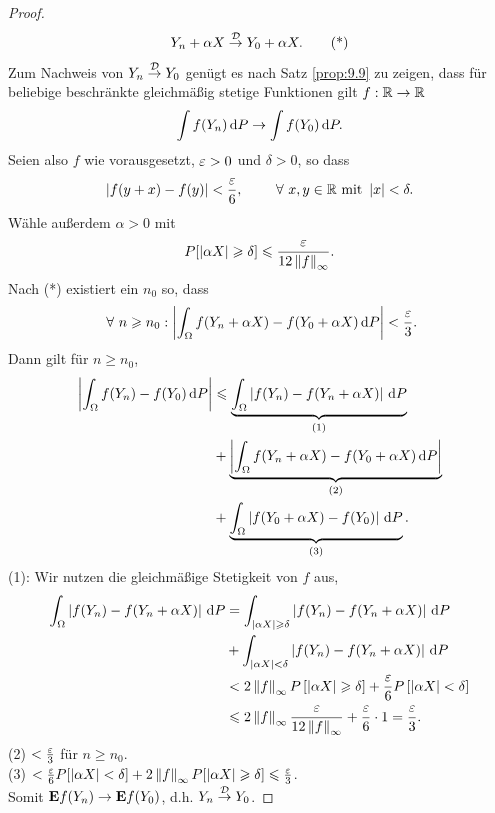 \begin{proof}
\begin{align*}
Y_n+\alpha X \overset{\mathcal{D}}{\to} Y_0 + \alpha X.\tag{*}
\end{align*}
Zum Nachweis von $Y_n\overset{\mathcal{D}}{\to} Y_0$ genügt es nach Satz \ref{prop:9.9} zu
zeigen, dass für beliebige beschränkte gleichmäßig stetige Funktionen gilt
$f:\mathbb{R}\to\mathbb{R}$
\begin{align*}
\int f(Y_n)\,\mathrm{d} P \to \int f(Y_0)\,\mathrm{d} P.
\end{align*}
Seien also $f$ wie vorausgesetzt, $\varepsilon > 0$ und $\delta > 0$, so dass
\begin{align*}
\abs{f(y+x)-f(y)} < \frac{\ep}{6},\qquad \forall x,y\in\R\text{ mit } \abs{x}<
\delta.
\end{align*}
Wähle außerdem $\alpha > 0$ mit
\begin{align*}
P[\left|\alpha X\right| \geqslant \delta] \leqslant \frac{\varepsilon}{12\left\|f\right\|_\infty}.
\end{align*}
Nach (*) existiert ein $n_0$ so, dass
\begin{align*}
\forall n\ge n_0 : \abs{\int_\Omega f(Y_n+\alpha X) - f(Y_0 + \alpha X)\dP} < 
\frac{\ep}{3}.
\end{align*}
Dann gilt für $n\ge n_0$,
\begin{align*}
\left|\int_\Omega f(Y_n)-f(Y_0)\,\mathrm{d} P\right| &\leqslant \underbrace{\int_\Omega
\left|f(Y_n)-f(Y_n+\alpha X)\right|\,\mathrm{d} P}_{(1)} \\
&+ \underbrace{\left|\int_\Omega f(Y_n+\alpha X)- f(Y_0+\alpha
X)\,\mathrm{d} P\right|}_{(2)} \\ &+ \underbrace{\int_\Omega \left|f(Y_0+\alpha
X)-f(Y_0)\right|\,\mathrm{d} P}_{(3)}.
\end{align*}
(1): Wir nutzen die gleichmäßige Stetigkeit von $f$ aus,
\begin{align*}
\int_\Omega \left|f(Y_n)-f(Y_n+\alpha
X)\right|\,\mathrm{d} P
&= \int_{\left|\alpha X\right|\geqslant \delta} \left|f(Y_n)-f(Y_n+\alpha
X)\right|\,\mathrm{d} P\\
&+\int_{\left|\alpha X\right|< \delta} \left|f(Y_n)-f(Y_n+\alpha
X)\right|\,\mathrm{d} P\\
&< 2\left\|f\right\|_\infty P\left[\left|\alpha X\right| \geqslant \delta\right] +
\frac{\varepsilon}{6}P\left[ \left|\alpha X\right| < \delta
\right]\\
&\leqslant
2\left\|f\right\|_\infty \frac{\varepsilon}{12\left\|f\right\|_\infty} + \frac{\varepsilon}{6}\cdot1
=
\frac{\varepsilon}{3}.
\end{align*}
(2) $< \frac{\varepsilon}{3}$ für $n\ge n_0$.\\
(3) $< \frac{\varepsilon}{6}P[\left|\alpha X\right|< \delta] + 2\left\|f\right\|_\infty
P[\left|\alpha X\right|\geqslant \delta] \leqslant \frac{\varepsilon}{3}$.\\
Somit $\textbf{E} f(Y_n)\to \textbf{E} f(Y_0)$, d.h. $Y_n\overset{\mathcal{D}}{\to}  Y_0$.\qedhere
\end{proof}

